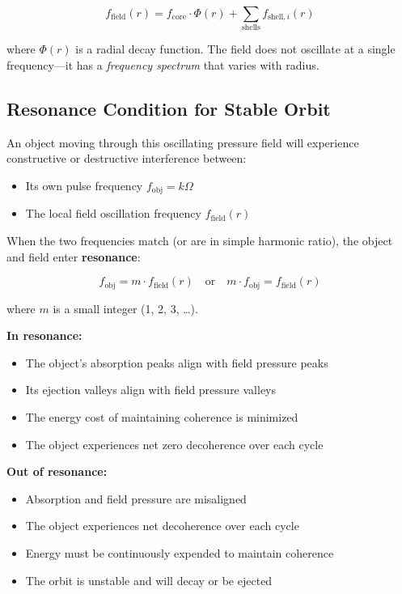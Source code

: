 \documentclass[12pt, a4paper]{article}
\begin{document}
\[
f_{\text{field}}(r) = f_{\text{core}} \cdot \Phi(r) + \sum_{\text{shells}} f_{\text{shell},i}(r)
\]

where \( \Phi(r) \) is a radial decay function. The field does not oscillate at a single frequency—it has a \textit{frequency spectrum} that varies with radius.

\subsection{Resonance Condition for Stable Orbit}
\label{subsec:resonance_condition}

An object moving through this oscillating pressure field will experience constructive or destructive interference between:
\begin{itemize}
    \item Its own pulse frequency \( f_{\text{obj}} = k\Omega \)
    \item The local field oscillation frequency \( f_{\text{field}}(r) \)
\end{itemize}

When the two frequencies match (or are in simple harmonic ratio), the object and field enter \textbf{resonance}:

\[
f_{\text{obj}} = m \cdot f_{\text{field}}(r) \quad \text{or} \quad m \cdot f_{\text{obj}} = f_{\text{field}}(r)
\]

where \( m \) is a small integer (1, 2, 3, \dots).

\textbf{In resonance:}
\begin{itemize}
    \item The object's absorption peaks align with field pressure peaks
    \item Its ejection valleys align with field pressure valleys
    \item The energy cost of maintaining coherence is minimized
    \item The object experiences net zero decoherence over each cycle
\end{itemize}

\textbf{Out of resonance:}
\begin{itemize}
    \item Absorption and field pressure are misaligned
    \item The object experiences net decoherence over each cycle
    \item Energy must be continuously expended to maintain coherence
    \item The orbit is unstable and will decay or be ejected
\end{itemize}
\end{document}
